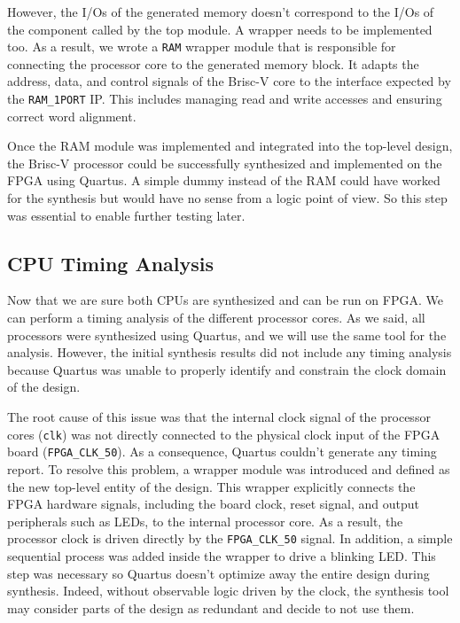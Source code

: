 \documentclass[12pt]{article}
\begin{document}
However, the I/Os of the generated memory doesn’t correspond to the I/Os of the component called by the top module. A wrapper needs to be implemented too. As a result, we wrote a \texttt{RAM} wrapper module that is responsible for connecting the processor core to the generated memory block. It adapts the address, data, and control signals of the Brisc-V core to the interface expected by the \texttt{RAM\_1PORT} IP. This includes managing read and write accesses and ensuring correct word alignment.

Once the RAM module was implemented and integrated into the top-level design, the Brisc-V processor could be successfully synthesized and implemented on the FPGA using Quartus. A simple dummy instead of the RAM could have worked for the synthesis but would have no sense from a logic point of view. So this step was essential to enable further testing later.


\subsection{CPU Timing Analysis}

Now that we are sure both CPUs are synthesized and can be run on FPGA. We can perform a timing analysis of the different processor cores. As we said, all processors were synthesized using Quartus, and we will use the same tool for the analysis. However, the initial synthesis results did not include any timing analysis because Quartus was unable to properly identify and constrain the clock domain of the design.

The root cause of this issue was that the internal clock signal of the processor cores (\texttt{clk}) was not directly connected to the physical clock input of the FPGA board (\texttt{FPGA\_CLK\_50}). As a consequence, Quartus couldn't generate any timing report. To resolve this problem, a wrapper module was introduced and defined as the new top-level entity of the design. This wrapper explicitly connects the FPGA hardware signals, including the board clock, reset signal, and output peripherals such as LEDs, to the internal processor core. As a result, the processor clock is driven directly by the \texttt{FPGA\_CLK\_50} signal. In addition, a simple sequential process was added inside the wrapper to drive a blinking LED. This step was necessary so Quartus doesn't optimize away the entire design during synthesis. Indeed, without observable logic driven by the clock, the synthesis tool may consider parts of the design as redundant and decide to not use them. 
\end{document}
